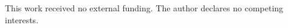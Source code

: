 \documentclass{article}
\begin{document}
\maketitle


\begin{ack}
This work received no external funding. The author declares no competing interests.
\end{ack}


\appendix

\newpage
{}
\end{document}
